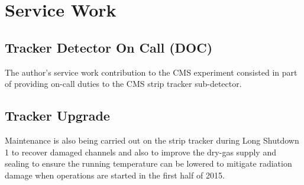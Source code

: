 \chapter{Service Work}
\label{ac:service_work}

\section{Tracker Detector On Call (DOC)}
\label{s:tracker_doc}
The author's service work contribution to the CMS experiment consisted in part of providing on-call duties to
the CMS strip tracker sub-detector.

\section{Tracker Upgrade}
\label{s:tracker_upgrade}
Maintenance is also being carried out on the strip tracker during Long Shutdown 1 to recover damaged channels
and also to improve the dry-gas supply and sealing to ensure the running temperature can be lowered to
mitigate radiation damage when operations are started in the first half of 2015.
